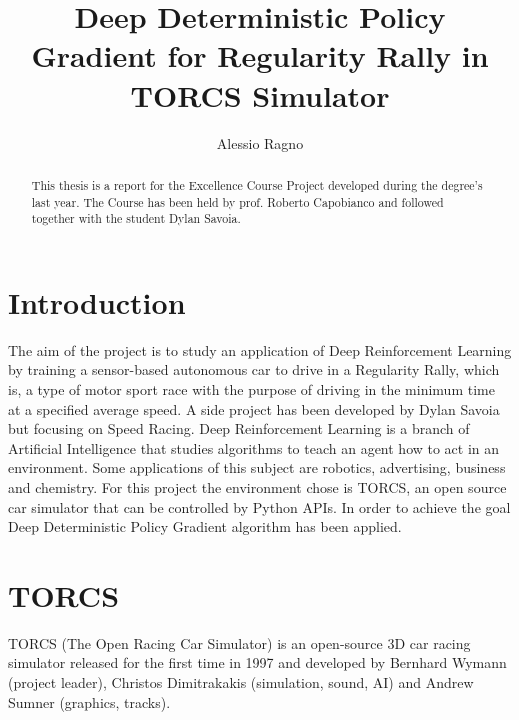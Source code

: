 \documentclass[binding=0.6cm,Lau,oneside]{sapthesis} %
\title{Deep Deterministic Policy Gradient for Regularity Rally in TORCS Simulator}
\author{Alessio Ragno}
\begin{document}
\frontmatter
\maketitle
\dedication{Dedicato a\newline Donald Knuth}
\begin{abstract}
This thesis is a report for the Excellence Course Project developed during the degree’s last year. The Course has been held by prof. Roberto Capobianco and followed together with the student Dylan Savoia.
\end{abstract}
\tableofcontents
\mainmatter
\chapter*{Introduction}
The aim of the project is to study an application of Deep Reinforcement Learning by training a sensor-based autonomous car to drive in a Regularity Rally, which is, a type of motor sport race with the purpose of driving in the minimum time at a specified average speed.\newline
A side project has been developed by Dylan Savoia but focusing on Speed Racing.\newline
Deep Reinforcement Learning is a branch of Artificial Intelligence that studies algorithms to teach an agent how to act in an environment. Some applications of this subject are robotics, advertising, business and chemistry.\newline
For this project the environment chose is TORCS, an open source car simulator that can be controlled by Python APIs.\newline
In order to achieve the goal Deep Deterministic Policy Gradient algorithm has been applied.\newline

\chapter{TORCS}
TORCS (The Open Racing Car Simulator) is an open-source 3D car racing simulator released for the first time in 1997 and developed by Bernhard Wymann (project leader), Christos Dimitrakakis (simulation, sound, AI) and Andrew Sumner (graphics, tracks).
\end{document}
